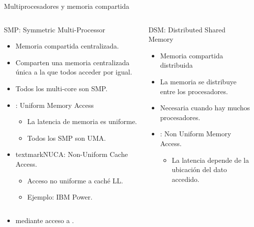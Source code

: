 \begin{frame}[t,shrink=10]{Multiprocesadores y memoria compartida}

\vspace{-1em}
\begin{columns}[T]


\begin{block}{SMP: Symmetric Multi-Processor}
\begin{itemize}
  \item Memoria compartida centralizada.
  \item Comparten una memoria centralizada única a la que todos acceder por igual.
  \item Todos los multi-core son SMP.
  \item {}: Uniform Memory Access
    \begin{itemize}
      \item La latencia de memoria es uniforme.
      \item Todos los SMP son UMA.
    \end{itemize}
  \item textmark{NUCA}: Non-Uniform Cache Access.
    \begin{itemize}
      \item Acceso no uniforme a caché LL.
      \item Ejemplo: IBM Power.
    \end{itemize}
\end{itemize}
\end{block}

\pause
{}

\begin{block}{DSM: Distributed Shared Memory}
\begin{itemize}
  \item Memoria compartida distribuida
  \item La memoria se distribuye entre los procesadores.
  \item Necesaria cuando hay muchos procesadores.
  \item {}: Non Uniform Memory Access.
    \begin{itemize}
      \item La latencia depende de la ubicación del dato accedido.
    \end{itemize}
\end{itemize}
\end{block}

\end{columns}


\begin{itemize}
  \item {} mediante acceso a 
        .
\end{itemize}
\end{frame}

